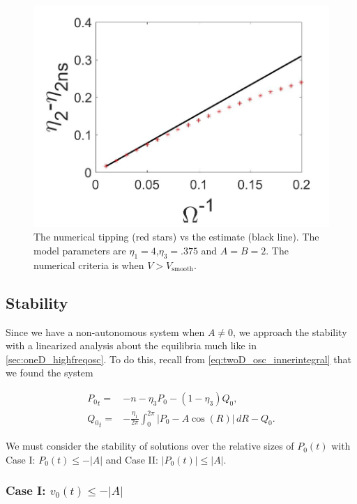 \begin{figure}[H]
\centering
\includegraphics[scale=.25]{twoD/osc_Omegacomp.jpg}
\caption{The numerical tipping (red stars) vs the estimate (black line). The model parameters are $\eta_1=4$,$\eta_3=.375$ and $A=B=2$. The numerical criteria is when $V>V_{\text{smooth}}$.}
\label{fig:twoD_osc_epscomp}
\end{figure}

\subsection{Stability}

Since we have a non-autonomous system when $A\not=0$, we approach the stability with a linearized analysis about the equilibria much like in \autoref{sec:oneD_highfreqosc}. To do this, recall from \eqref{eq:twoD_osc_innerintegral} that we found the system

\begin{equation}\label{eq:twoD_osc_stabilityequation}
\begin{aligned}
{P_0}_t =& -n -\eta_3 P_0-(1-\eta_3)Q_0,\\
{Q_0}_t =& -\frac{\eta_1}{2\pi}\int_0^{2\pi}|P_0-A\cos(R)|\, dR - Q_0.
\end{aligned}
\end{equation}

We must consider the stability of solutions over the relative sizes of $P_0(t)$ with Case I: $P_0(t)\le -|A|$ and Case II: $|P_0(t)|\le |A|$.

\subsubsection{Case I: $v_0(t)\le -|A|$}

